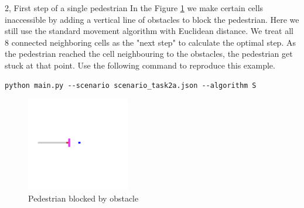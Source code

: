 \documentclass[10pt,a4paper]{article}
\begin{document}
\begin{task}{2, First step of a single pedestrian}
In the Figure \ref{pedestrian_block} we make certain cells inaccessible by adding a vertical line of obstacles to block the pedestrian. Here we still use the standard movement algorithm with Euclidean distance. We treat all 8 connected neighboring cells as the "next step" to calculate the optimal step. As the pedestrian reached the cell neighbouring to the obstacles, the pedestrian get stuck at that point. Use the following command to reproduce this example.

\begin{verbatim}
python main.py --scenario scenario_task2a.json --algorithm S
\end{verbatim}

\begin{figure}[H] 
\centering
\includegraphics[width=0.4\textwidth]{report-template/image/Task1_7.png}
\caption{Pedestrian blocked by obstacle}
\label{pedestrian_block}
\end{figure}
\end{task}
\end{document}
